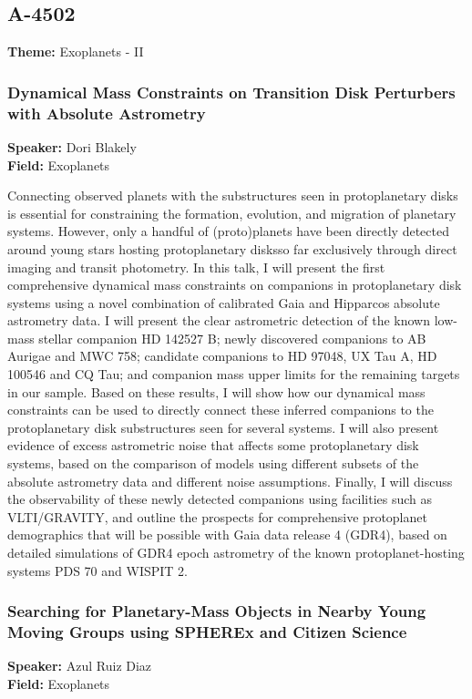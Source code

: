 \subsection*{A-4502}
\textbf{Theme:} Exoplanets - II

\hypertarget{abstract-talk-31}{}\label{abstract-page-talk-31}
\subsubsection*{Dynamical Mass Constraints on Transition Disk Perturbers with Absolute Astrometry}
\textbf{Speaker:} Dori Blakely\\
\textbf{Field:} Exoplanets

Connecting observed planets with the substructures seen in protoplanetary disks is essential for constraining the formation, evolution, and migration of planetary systems. However, only a handful of (proto)planets have been directly detected around young stars hosting protoplanetary disksso far exclusively through direct imaging and transit photometry. In this talk, I will present the first comprehensive dynamical mass constraints on companions in protoplanetary disk systems using a novel combination of calibrated Gaia and Hipparcos absolute astrometry data. I will present the clear astrometric detection of the known low-mass stellar companion HD 142527 B; newly discovered companions to AB Aurigae and MWC 758; candidate companions to HD 97048, UX Tau A, HD 100546 and CQ Tau; and companion mass upper limits for the remaining targets in our sample. Based on these results, I will show how our dynamical mass constraints can be used to directly connect these inferred companions to the protoplanetary disk substructures seen for several systems. I will also present evidence of excess astrometric noise that affects some protoplanetary disk systems, based on the comparison of models using different subsets of the absolute astrometry data and different noise assumptions. Finally, I will discuss the observability of these newly detected companions using facilities such as VLTI/GRAVITY, and outline the prospects for comprehensive protoplanet demographics that will be possible with Gaia data release 4 (GDR4), based on detailed simulations of GDR4 epoch astrometry of the known protoplanet-hosting systems PDS 70 and WISPIT 2.

\hypertarget{abstract-talk-8}{}\label{abstract-page-talk-8}
\subsubsection*{Searching for Planetary-Mass Objects in Nearby Young Moving Groups using SPHEREx and Citizen Science}
\textbf{Speaker:} Azul Ruiz Diaz\\
\textbf{Field:} Exoplanets

